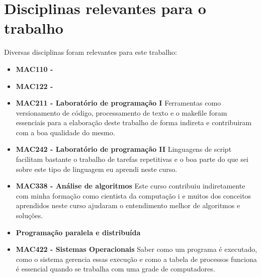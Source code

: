 \documentclass[a4paper,12pt,titlepage]{article}
\begin{document}
\section{Disciplinas relevantes para o trabalho}

Diversas disciplinas foram relevantes para este trabalho:

\begin{itemize}
  \item \textbf{MAC110 - }
  \item \textbf{MAC122 - }
  \item \textbf{MAC211 - Laboratório de programação I} Ferramentas como versionamento de código, processamento de 
texto e o makefile foram essenciais para a elaboração deste trabalho de forma indireta e contribuiram com a 
boa qualidade do mesmo.
  \item \textbf{MAC242 - Laboratório de programação II} Linguagens de script facilitam bastante o trabalho de tarefas 
repetitivas e o boa parte do que sei sobre este tipo de linguagem eu aprendi neste curso.
  \item \textbf{MAC338 - Análise de algoritmos} Este curso contribuiu indiretamente com minha formação como cientista da computação i
e muitos dos conceitos aprendidos neste curso ajudaram o entendimento melhor de algoritmos e soluções.
  \item \textbf{Programação paralela e distribuída}
  \item \textbf{MAC422 - Sistemas Operacionais} Saber como um programa é executado, como o sistema gerencia essas execução e como a tabela de processos
funciona é essencial quando se trabalha com uma grade de computadores.  
\end{itemize}




\end{document}

